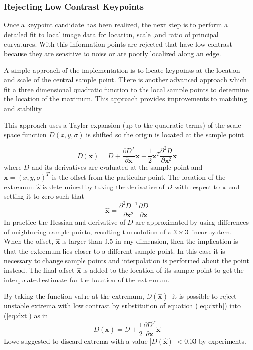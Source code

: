 \documentclass{article}
\begin{document}
\subsubsection{Rejecting Low Contrast Keypoints}\label{SS:AKL}
Once a keypoint candidate has been realized, the next step is to perform a detailed fit to local image data for location, scale ,and ratio of principal curvatures. 
With this information points are rejected that have low contrast because they are sensitive to noise or are poorly localized along an edge.  

A simple approach of the implementation is to locate keypoints at the location and scale of the central sample point. 
There is another advanced approach which fit a three dimensional quadratic function to the local sample points to determine the location of the maximum. 
This approach provides improvements to matching and stability.  

This approach uses a Taylor expansion (up to the quadratic terms) of the scale-space function $D(x,y,\sigma)$ is shifted so the origin is located at the sample point

\begin{equation}
  D(\mathbf{x}) = D + \frac{\partial D^T}{\partial{ \mathbf{x}}}\mathbf{x} + \frac{1}{2}\mathbf{x}^T\frac{\partial^2 D}{\partial\mathbf{x}^2}\mathbf{x}
\end{equation}\label{eq:dxt}
where $D$ and its derivatives are evaluated at the sample point and $\mathbf{x} = (x,y,\sigma)^T$ is the offset from the particular point.  
The location of the extremum $\mathbf{\hat{x}}$ is determined by taking the derivative of $D$ with respect to $\mathbf{x}$ and setting it to zero such that
\begin{equation}
  \mathbf{\hat{x}} = \frac{\partial^2 D^{-1}}{\partial\mathbf{x}^2}\frac{\partial D}{\partial{ \mathbf{x}}}
\end{equation}\label{eq:dxth}
In practice the Hessian and derivative of $D$ are approximated by using differences of neighboring sample points, resulting the solution of a $3\times 3$ linear system.  When the offset, $\mathbf{\hat{x}}$ is larger than 0.5 in any dimension, then the implication is that the extremum lies closer to a different sample point.  In this case it is necessary to change sample points and interpolation is performed about the point instead.  The final offset $\mathbf{\hat{x}}$ is added to the location of its sample point to get the interpolated estimate for the location of the extremum.

By taking the function value at the extremum,  $D(\mathbf{\hat{x}})$, it is possible to reject unstable extrema with low contrast by substitution of equation (\ref{eq:dxth}) into (\ref{eq:dxt}) as in  
\begin{equation}
  D(\mathbf{\hat{x}}) = D + \frac{1}{2}\frac{\partial D^T}{\partial\mathbf{x}}\mathbf{\hat{x}}
\end{equation}
Lowe suggested to discard extrema with a value $|D(\mathbf{\hat{x}})| < 0.03$ by experiments. 
\end{document}
